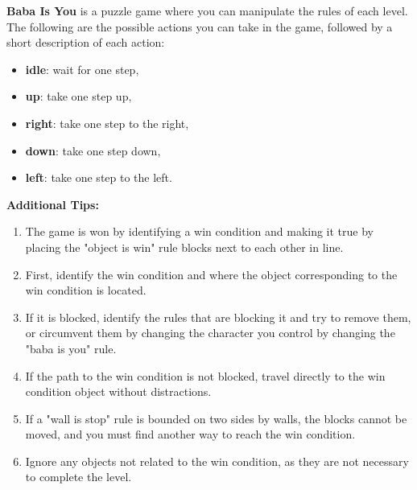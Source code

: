 \begin{GreenBox}
	[frametitle={\textbf{Iteration 1 Baba-is-ai Prompt}}] \label{box:baba_is_you_iter_1}
	\textbf{Baba Is You} is a puzzle game where you can manipulate the rules of
	each level. The following are the possible actions you can take in the game,
	followed by a short description of each action:

	\begin{itemize}
		\item \textbf{idle}: wait for one step,

		\item \textbf{up}: take one step up,

		\item \textbf{right}: take one step to the right,

		\item \textbf{down}: take one step down,

		\item \textbf{left}: take one step to the left.
	\end{itemize}

	\textbf{Additional Tips:}
	\begin{enumerate}
		\item The game is won by identifying a win condition and making it true by placing
			the "object is win" rule blocks next to each other in line.

		\item First, identify the win condition and where the object corresponding
			to the win condition is located.

		\item If it is blocked, identify the rules that are blocking it and try to
			remove them, or circumvent them by changing the character you control by changing
			the "baba is you" rule.

		\item If the path to the win condition is not blocked, travel directly to
			the win condition object without distractions.

		\item If a "wall is stop" rule is bounded on two sides by walls, the blocks
			cannot be moved, and you must find another way to reach the win condition.

		\item Ignore any objects not related to the win condition, as they are not
			necessary to complete the level.
	\end{enumerate}


\end{GreenBox}
